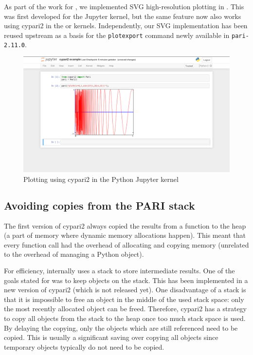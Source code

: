 \documentclass{deliverablereport}
\begin{document}
As part of the work for ,
we implemented SVG high-resolution plotting in \Pari.
This was first developed for the \PariGP Jupyter kernel,
but the same feature now also works using cypari2
in the \Python or \Sage \Jupyter kernels.
Independently, our SVG implementation has been reused upstream as a
basis for the \verb/plotexport/ command newly available in \texttt{pari-2.11.0}.

\begin{figure}[ht]
  \includegraphics[width=\textwidth,trim={60px 100px 60px 1px},clip]{jupyter-cypari2.png}
  \caption{Plotting using cypari2 in the Python Jupyter kernel}
\end{figure}

\subsection{Avoiding copies from the PARI stack}

The first version of cypari2 always copied the results from a
\PariGP function to the heap
(a part of memory where dynamic memory allocations happen).
This meant that every function call had the overhead
of allocating and copying memory
(unrelated to the overhead of managing a Python object).

For efficiency, \Pari internally uses a stack to store intermediate results.
One of the goals stated for  was to
keep objects on the \Pari stack.
This has been implemented in a new version of cypari2 (which is not released yet).
One disadvantage of a stack is that it is impossible
to free an object in the middle of the used stack space:
only the most recently allocated object can be freed.
Therefore, cypari2 has a strategy to copy all objects
from the stack to the heap once too much stack space is used.
By delaying the copying, only the objects which are still referenced
need to be copied.
This is usually a significant saving over copying all objects
since temporary objects typically do not need to be copied.
\end{document}
